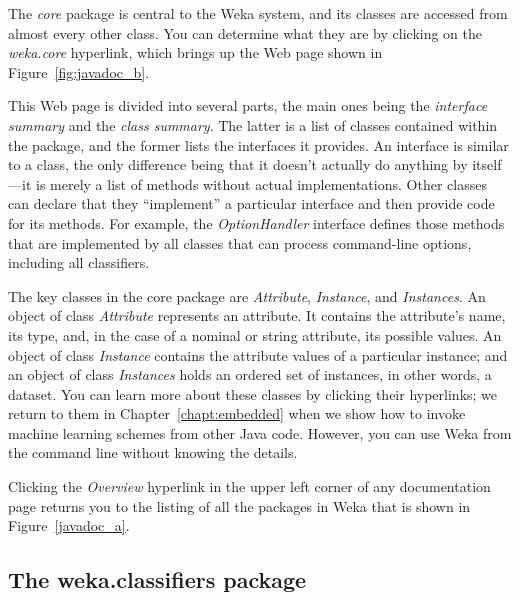 The \textit{core} package is central to the Weka system, and its
classes are accessed from almost every other class. You can determine
what they are by clicking on the \textit{weka.core} hyperlink, which
brings up the Web page shown in Figure~\ref{fig:javadoc_b}.

This Web page is divided into several parts, the main ones being the
\textit{interface summary} and the \textit{class summary}. The latter
is a list of classes contained within the package, and the former
lists the interfaces it provides. An interface is similar to a class,
the only difference being that it doesn’t actually do anything by
itself---it is merely a list of methods without actual
implementations. Other classes can declare that they ``implement'' a
particular interface and then provide code for its methods. For
example, the \textit{OptionHandler} interface defines those methods
that are implemented by all classes that can process command-line
options, including all classifiers.

The key classes in the core package are \textit{Attribute},
\textit{Instance}, and \textit{Instances}. An object of class
\textit{Attribute} represents an attribute. It contains the
attribute's name, its type, and, in the case of a nominal or string
attribute, its possible values. An object of class \textit{Instance}
contains the attribute values of a particular instance; and an object
of class \textit{Instances} holds an ordered set of instances, in
other words, a dataset. You can learn more about these classes by
clicking their hyperlinks; we return to them in
Chapter~\ref{chapt:embedded} when we show how to invoke machine
learning schemes from other Java code. However, you can use Weka from
the command line without knowing the details.

Clicking the \textit{Overview} hyperlink in the upper left corner of
any documentation page returns you to the listing of all the packages
in Weka that is shown in Figure~\ref{javadoc_a}.

\subsection{The weka.classifiers package}

